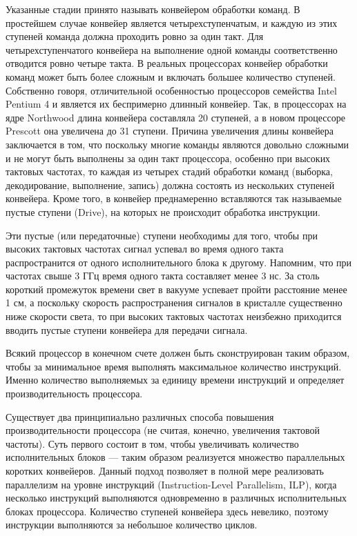 \documentclass[12pt, a4paper, utf8]{article}
\begin{document}
Указанные стадии принято называть конвейером обработки команд. В простейшем случае конвейер является четырехступенчатым, и каждую из этих ступеней команда должна проходить ровно за один такт. Для четырехступенчатого конвейера на выполнение одной команды соответственно отводится ровно четыре такта.
В реальных процессорах конвейер обработки команд может быть более сложным и включать большее количество ступеней. Собственно говоря, отличительной особенностью процессоров семейства Intel Pentium 4 и является их беспримерно длинный конвейер. Так, в процессорах на ядре Northwood длина конвейера составляла 20 ступеней, а в новом процессоре Prescott она увеличена до 31 ступени. Причина увеличения длины конвейера заключается в том, что поскольку многие команды являются довольно сложными и не могут быть выполнены за один такт процессора, особенно при высоких тактовых частотах, то каждая из четырех стадий обработки команд (выборка, декодирование, выполнение, запись) должна состоять из нескольких ступеней конвейера. Кроме того, в конвейер преднамеренно вставляются так называемые пустые ступени (Drive), на которых не происходит обработка инструкции.

Эти пустые (или передаточные) ступени необходимы для того, чтобы при высоких тактовых частотах сигнал успевал во время одного такта распространится от одного исполнительного блока к другому. Напомним, что при частотах свыше 3 ГГц время одного такта составляет менее 3 нс. За столь короткий промежуток времени свет в вакууме успевает пройти расстояние менее 1 см, а поскольку скорость распространения сигналов в кристалле существенно ниже скорости света, то при высоких тактовых частотах неизбежно приходится вводить пустые ступени конвейера для передачи сигнала.

Всякий процессор в конечном счете должен быть сконструирован таким образом, чтобы за минимальное время выполнять максимальное количество инструкций. Именно количество выполняемых за единицу времени инструкций и определяет производительность процессора.

Существует два принципиально различных способа повышения производительности процессора (не считая, конечно, увеличения тактовой частоты). Суть первого состоит в том, чтобы увеличивать количество исполнительных блоков — таким образом реализуется множество параллельных коротких конвейеров. Данный подход позволяет в полной мере реализовать параллелизм на уровне инструкций (Instruction-Level Parallelism, ILP), когда несколько инструкций выполняются одновременно в различных исполнительных блоках процессора. Количество ступеней конвейера здесь невелико, поэтому инструкции выполняются за небольшое количество циклов.
\end{document}
